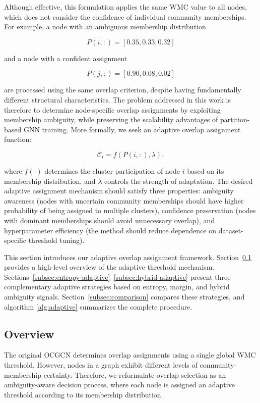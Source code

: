 \documentclass[pdflatex,sn-mathphys-num]{sn-jnl}%
\theoremstyle{thmstyleone}%
\theoremstyle{thmstyletwo}%
\theoremstyle{thmstylethree}%
\begin{document}
Although effective, this formulation applies the same $\mathrm{WMC}$ value to all nodes, which does not consider the confidence of individual community memberships.
For example, a node with an ambiguous membership distribution

\[
P(i,:)=[0.35,0.33,0.32]
\]

and a node with a confident assignment

\[
P(j,:)=[0.90,0.08,0.02]
\]

are processed using the same overlap criterion, despite having fundamentally different structural characteristics.
The problem addressed in this work is therefore to determine node-specific overlap assignments by exploiting membership ambiguity, while preserving the scalability advantages of partition-based GNN training.
More formally, we seek an adaptive overlap assignment function:

\begin{equation}
\mathcal{C}_i=f(P(i,:),\lambda),
\end{equation}

where $f(\cdot)$ determines the cluster participation of node $i$ based on its membership distribution, and $\lambda$ controls the strength of adaptation.
The desired adaptive assignment mechanism should satisfy three properties: ambiguity awareness (nodes with uncertain community memberships should have higher probability of being assigned to multiple clusters), confidence preservation (nodes with dominant memberships should avoid unnecessary overlap), and hyperparameter efficiency (the method should reduce dependence on dataset-specific threshold tuning).

This section introduces our adaptive overlap assignment framework.
Section~\ref{subsec:overview} provides a high-level overview of the adaptive threshold mechanism.
Sections~\ref{subsec:entropy-adaptive}--\ref{subsec:hybrid-adaptive} present three complementary adaptive strategies based on entropy, margin, and hybrid ambiguity signals.
Section~\ref{subsec:comparison} compares these strategies, and algorithm \ref{alg:adaptive} summarizes the complete procedure.



\subsection{Overview}
\label{subsec:overview}

The original OCGCN determines overlap assignments using a single global WMC threshold.
However, nodes in a graph exhibit different levels of community-membership certainty.
Therefore, we reformulate overlap selection as an ambiguity-aware decision process, where each node is assigned an adaptive threshold according to its membership distribution.
\end{document}
